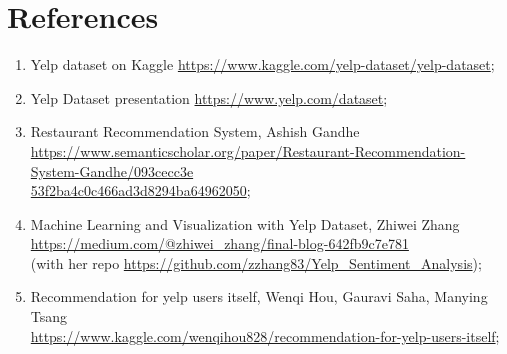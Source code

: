 
\section{References}

\begin{enumerate}
    \item Yelp dataset on Kaggle \href{https://www.kaggle.com/yelp-dataset/yelp-dataset}{https://www.kaggle.com/yelp-dataset/yelp-dataset};
    \item Yelp Dataset presentation \href{https://www.yelp.com/dataset}{https://www.yelp.com/dataset};
    \item Restaurant Recommendation System, Ashish Gandhe \\ \href{https://www.semanticscholar.org/paper/Restaurant-Recommendation-System-Gandhe/093cecc3e53f2ba4c0c466ad3d8294ba64962050}{https://www.semanticscholar.org/paper/Restaurant-Recommendation-System-Gandhe/093cecc3e\\53f2ba4c0c466ad3d8294ba64962050}; \label{Gandhe}
    \item Machine Learning and Visualization with Yelp Dataset, Zhiwei Zhang \\ \href{https://medium.com/@zhiwei_zhang/final-blog-642fb9c7e781}{https://medium.com/@zhiwei\_zhang/final-blog-642fb9c7e781} \\
    (with her repo \href{https://github.com/zzhang83/Yelp_Sentiment_Analysis}{https://github.com/zzhang83/Yelp\_Sentiment\_Analysis}); \label{Zhang}
    \item Recommendation for yelp users itself, Wenqi Hou, Gauravi Saha, Manying Tsang \\ \href{https://www.kaggle.com/wenqihou828/recommendation-for-yelp-users-itself}{https://www.kaggle.com/wenqihou828/recommendation-for-yelp-users-itself}; \label{Hou}
\end{enumerate}
